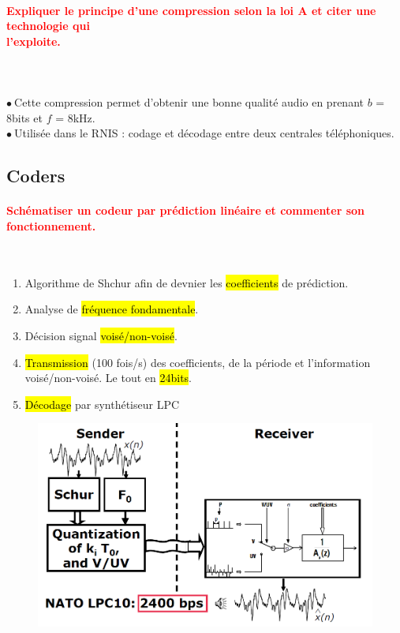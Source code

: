 \documentclass[letterpaper, 12pt]{article}
\newcommand{\red}[1]{
	\textcolor{red}{#1}
}
\newcommand{\point}{$\bullet\ $}
\begin{document}
		\paragraph{\red{Expliquer le principe d'une compression selon la loi A et citer une technologie qui 
		~\\ \hspace*{0.035cm} l'exploite.}}~\\~\\
			\point Cette compression permet d'obtenir une bonne qualité audio en prenant $b$ = 8bits et $f$ = 8kHz. \\
			\point Utilisée dans le RNIS : codage et décodage entre deux centrales téléphoniques.
	
	\subsection{Coders}
		
		\paragraph{\red{Schématiser un codeur par prédiction linéaire et commenter son fonctionnement.}}~\\
		\begin{minipage}{0.4\textwidth}
			\begin{enumerate}
				\setlength{\itemsep}{0pt}		
				\setlength{\parskip}{0pt}		
				\setlength{\parsep}{0pt}
				\item Algorithme de Shchur afin de devnier les \hl{coefficients} de prédiction.
				\item Analyse de \hl{fr\'equence fondamentale}.
				\item Décision signal \hl{vois\'e/non-vois\'e}.
				\item \hl{Transmission} (100 fois/s) des coefficients, de la période et l'information 
					voisé/non-voisé. Le tout en \hl{24bits}.
				\item \hl{D\'ecodage} par synthétiseur LPC
			\end{enumerate}
		\end{minipage}\hfill
		\begin{minipage}{0.55\textwidth}
			\begin{figure}[H]
				\centering
				\includegraphics[scale=0.5]{Images/coder-lpc}
			\end{figure}\noindent
		\end{minipage}
\end{document}
